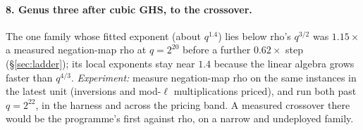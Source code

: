 \paragraph{8. Genus three after cubic GHS, to the crossover.} The one
family whose fitted exponent (about $q^{1.4}$) lies below rho's $q^{3/2}$ was
$1.15\times$ a measured negation-map rho at $q=2^{20}$ before a further
$0.62\times$ step (\S\ref{sec:ladder}); its local exponents stay near
$1.4$ because the linear algebra grows faster than $q^{4/3}$.
\emph{Experiment:} measure negation-map rho on the same instances in the
latest unit (inversions and mod-$\ell$ multiplications priced), and run
both past $q=2^{22}$, in the harness and across the pricing band. A measured
crossover there would be the programme's first  against rho,
on a narrow and undeployed family.
